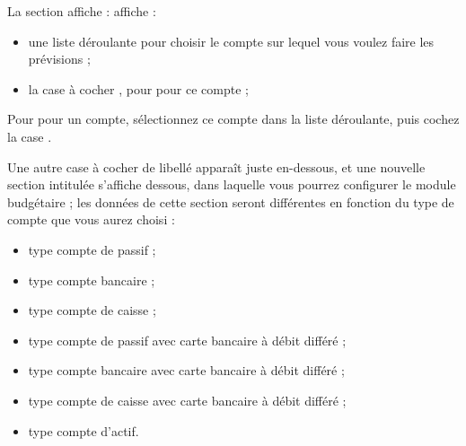 La section  \ifIllustration affiche :
\else affiche : 
\fi

\begin{itemize}
	\item une liste déroulante pour choisir le compte sur lequel vous voulez faire les prévisions ;
	\item la case à cocher , pour  pour ce compte ; 
	
\end{itemize}



Pour  pour un compte, sélectionnez ce compte dans la liste déroulante, puis cochez la case . 

Une autre case à cocher de libellé  apparaît juste en-dessous, et une nouvelle section intitulée  s'affiche dessous, dans laquelle vous pourrez configurer le module budgétaire ; les données de cette section seront différentes en fonction du type de compte que vous aurez choisi :


\begin{itemize}
	\item type compte de passif ;
	\item type compte bancaire ;
	\item type compte de caisse ;		
	\item type compte de passif avec carte bancaire à débit différé ;	
	\item type compte bancaire avec carte bancaire à débit différé ;
	\item type compte de caisse avec carte bancaire à débit différé ;
	\item type compte d'actif.	
\end{itemize}		


